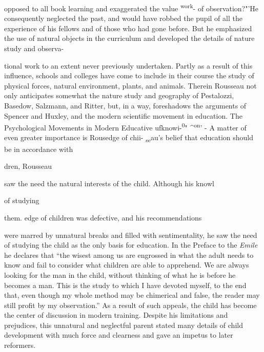 \documentclass[]{book}
\begin{document}
opposed to all book learning and exaggerated the value \textsuperscript{work}- of observation?"'He consequently neglected the past, and would have robbed the pupil of all the experience of his fellows and of those who had gone before. But he emphasized the use of natural objects in the curriculum and developed the details of nature study and observa-

tional work to an extent never previously undertaken. Partly as a result of this influence, schools and colleges have come to include in their course the study of physical forces, natural environment, plants, and animals. Therein Rousseau not only anticipates somewhat the nature study and geography of Pestalozzi, Basedow, Salzmann, and Ritter, but, in a way, foreshadows the arguments of Spencer and Huxley, and the modern scientific movement in education. The Psychological Movements in Modern Educative ufknowi-\textsuperscript{0}" \^{}\textsuperscript{on}' - A matter of even greater importance is Rousedge of chii- \textsubscript{se}au's belief that education should be in accordance with

dren, Rousseau

saw the need the natural interests of the child. Although his knowl

of studying

them. edge of children was defective, and his recommendations

were marred by unnatural breaks and filled with sentimentality, he saw the need of studying the child as the only basis for education. In the Preface to the \emph{Emile} he declares that ``the wisest among us are engrossed in what the adult needs to know and fail to consider what children are able to apprehend. We are always looking for the man in the child, without thinking of what he is before he becomes a man. This is the study to which I have devoted myself, to the end that, even though my whole method may be chimerical and false, the reader may still profit by my observation.'' As a result of such appeals, the child has become the center of discussion in modern training. Despite his limitations and prejudices, this unnatural and neglectful parent stated many details of child development with much force and clearness and gave an impetus to later reformers.
\end{document}
